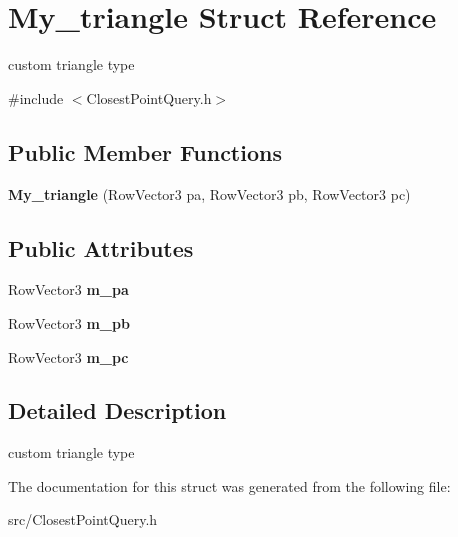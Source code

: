 \hypertarget{struct_my__triangle}{}\section{My\+\_\+triangle Struct Reference}
\label{struct_my__triangle}


custom triangle type  




{\ttfamily \#include $<$Closest\+Point\+Query.\+h$>$}

\subsection*{Public Member Functions}
\begin{DoxyCompactItemize}
\item 
{\bfseries My\+\_\+triangle} (Row\+Vector3 pa, Row\+Vector3 pb, Row\+Vector3 pc)\hypertarget{struct_my__triangle_ac09b37f8156747d89d0450d941bd60b6}{}\label{struct_my__triangle_ac09b37f8156747d89d0450d941bd60b6}

\end{DoxyCompactItemize}
\subsection*{Public Attributes}
\begin{DoxyCompactItemize}
\item 
Row\+Vector3 {\bfseries m\+\_\+pa}\hypertarget{struct_my__triangle_ad757aa5593e6d14f570e6f4bebe9b20f}{}\label{struct_my__triangle_ad757aa5593e6d14f570e6f4bebe9b20f}

\item 
Row\+Vector3 {\bfseries m\+\_\+pb}\hypertarget{struct_my__triangle_a6377cf979e4fa000db60657cd286bb72}{}\label{struct_my__triangle_a6377cf979e4fa000db60657cd286bb72}

\item 
Row\+Vector3 {\bfseries m\+\_\+pc}\hypertarget{struct_my__triangle_a95c6eb47b070112bb62a660f82cc49cf}{}\label{struct_my__triangle_a95c6eb47b070112bb62a660f82cc49cf}

\end{DoxyCompactItemize}


\subsection{Detailed Description}
custom triangle type 

The documentation for this struct was generated from the following file\+:\begin{DoxyCompactItemize}
\item 
src/Closest\+Point\+Query.\+h\end{DoxyCompactItemize}
